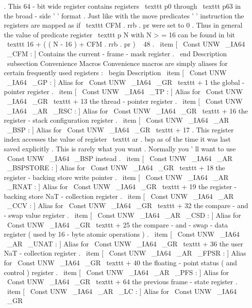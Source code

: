 .
This
64
-
bit
wide
register
contains
registers
\
texttt
{
p0
}
through
\
texttt
{
p63
}
in
the
broad
-
side
'
'
format
.
Just
like
with
the
move
predicates
'
'
instruction
the
registers
are
mapped
as
if
\
texttt
{
CFM
.
rrb
.
pr
}
were
set
to
0
.
Thus
in
general
the
value
of
predicate
register
\
texttt
{
p
}
N
with
N
>
=
16
can
be
found
in
bit
\
texttt
{
16
+
(
(
N
-
16
)
+
CFM
.
rrb
.
pr
)
\
%
48
}
.
\
item
[
\
Const
{
UNW
\
_IA64
\
_CFM
}
:
]
Contains
the
current
-
frame
-
mask
register
.
\
end
{
Description
}
\
subsection
{
Convenience
Macros
}
Convenience
macros
are
simply
aliases
for
certain
frequently
used
registers
:
\
begin
{
Description
}
\
item
[
\
Const
{
UNW
\
_IA64
\
_GP
}
:
]
Alias
for
\
Const
{
UNW
\
_IA64
\
_GR
}
\
texttt
{
+
1
}
the
global
-
pointer
register
.
\
item
[
\
Const
{
UNW
\
_IA64
\
_TP
}
:
]
Alias
for
\
Const
{
UNW
\
_IA64
\
_GR
}
\
texttt
{
+
13
}
the
thread
-
pointer
register
.
\
item
[
\
Const
{
UNW
\
_IA64
\
_AR
\
_RSC
}
:
]
Alias
for
\
Const
{
UNW
\
_IA64
\
_GR
}
\
texttt
{
+
16
}
the
register
-
stack
configuration
register
.
\
item
[
\
Const
{
UNW
\
_IA64
\
_AR
\
_BSP
}
:
]
Alias
for
\
Const
{
UNW
\
_IA64
\
_GR
}
\
texttt
{
+
17
}
.
This
register
index
accesses
the
value
of
register
\
texttt
{
ar
.
bsp
}
as
of
the
time
it
was
last
saved
explicitly
.
This
is
rarely
what
you
want
.
Normally
you
'
ll
want
to
use
\
Const
{
UNW
\
_IA64
\
_BSP
}
instead
.
\
item
[
\
Const
{
UNW
\
_IA64
\
_AR
\
_BSPSTORE
}
:
]
Alias
for
\
Const
{
UNW
\
_IA64
\
_GR
}
\
texttt
{
+
18
}
the
register
-
backing
store
write
pointer
.
\
item
[
\
Const
{
UNW
\
_IA64
\
_AR
\
_RNAT
}
:
]
Alias
for
\
Const
{
UNW
\
_IA64
\
_GR
}
\
texttt
{
+
19
}
the
register
-
backing
store
NaT
-
collection
register
.
\
item
[
\
Const
{
UNW
\
_IA64
\
_AR
\
_CCV
}
:
]
Alias
for
\
Const
{
UNW
\
_IA64
\
_GR
}
\
texttt
{
+
32
}
the
compare
-
and
-
swap
value
register
.
\
item
[
\
Const
{
UNW
\
_IA64
\
_AR
\
_CSD
}
:
]
Alias
for
\
Const
{
UNW
\
_IA64
\
_GR
}
\
texttt
{
+
25
}
the
compare
-
and
-
swap
-
data
register
(
used
by
16
-
byte
atomic
operations
)
.
\
item
[
\
Const
{
UNW
\
_IA64
\
_AR
\
_UNAT
}
:
]
Alias
for
\
Const
{
UNW
\
_IA64
\
_GR
}
\
texttt
{
+
36
}
the
user
NaT
-
collection
register
.
\
item
[
\
Const
{
UNW
\
_IA64
\
_AR
\
_FPSR
}
:
]
Alias
for
\
Const
{
UNW
\
_IA64
\
_GR
}
\
texttt
{
+
40
}
the
floating
-
point
status
(
and
control
)
register
.
\
item
[
\
Const
{
UNW
\
_IA64
\
_AR
\
_PFS
}
:
]
Alias
for
\
Const
{
UNW
\
_IA64
\
_GR
}
\
texttt
{
+
64
}
the
previous
frame
-
state
register
.
\
item
[
\
Const
{
UNW
\
_IA64
\
_AR
\
_LC
}
:
]
Alias
for
\
Const
{
UNW
\
_IA64
\
_GR
}
